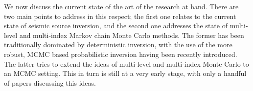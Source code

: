 
\hspace*{0.3cm}

\noindent We now discuss the current state of the art of the research at hand. There are two main points to address in this respect; the first one relates to the current state of seismic source inversion, and the second one addresses the state of  multi-level and multi-index Markov chain Monte Carlo methods. The former has been traditionally dominated by deterministic inversion, with the use of the more robust, MCMC based probabilistic inversion having been recently introduced. The latter tries to extend the ideas of multi-level and multi-index Monte Carlo to an MCMC setting. This in turn is still at a very early stage, with only a handful of papers discussing this ideas.  

